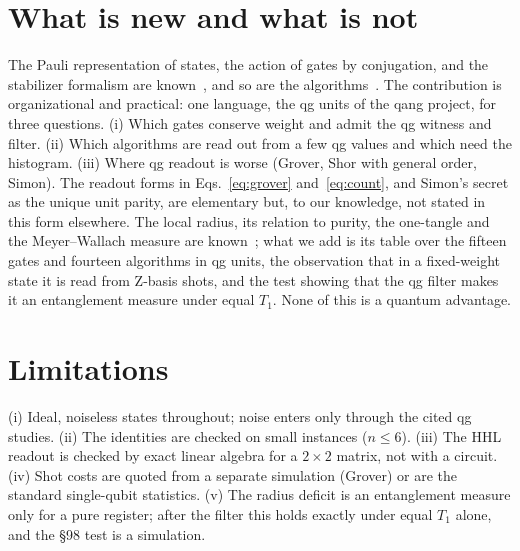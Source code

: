 \documentclass[11pt]{article}
\begin{document}
\section{What is new and what is not}

The Pauli representation of states, the action of gates by conjugation, and the stabilizer formalism are
known~\cite{gottesman1998,nielsen2010quantum}, and so are the algorithms~\cite{deutsch1992,bernstein1997,simon1997,
shor1997,grover1996,kitaev1995,harrow2009,peruzzo2014,farhi2014,brassard1998,farhi1998walk,havlicek2019,
lloyd2014qpca}. The contribution is organizational and practical: one language, the qg units of the qang
project, for three questions. (i) Which gates conserve weight and admit the qg witness and filter. (ii) Which
algorithms are read out from a few qg values and which need the histogram. (iii) Where qg readout is worse
(Grover, Shor with general order, Simon). The readout forms in Eqs.~\eqref{eq:grover} and~\eqref{eq:count}, and
Simon's secret as the unique unit parity, are elementary but, to our knowledge, not stated in this form
elsewhere. The local radius, its relation to purity, the one-tangle and the Meyer--Wallach
measure are known~\cite{wootters1998,coffman2000,meyer2002,brennen2003}; what we add is its table over the fifteen
gates and fourteen algorithms in qg units, the observation that in a fixed-weight state it is read from Z-basis
shots, and the test showing that the qg filter makes it an entanglement measure under equal $T_1$. None of this is a
quantum advantage.

\section{Limitations}

(i) Ideal, noiseless states throughout; noise enters only through the cited qg studies. (ii) The identities are
checked on small instances ($n\le6$). (iii) The HHL readout is checked by exact linear algebra for a $2\times2$
matrix, not with a circuit. (iv) Shot costs are quoted from a separate simulation (Grover) or are the standard
single-qubit statistics. (v) The radius deficit is an entanglement measure only for a pure register; after the
filter this holds exactly under equal $T_1$ alone, and the \S98 test is a simulation.
\end{document}
